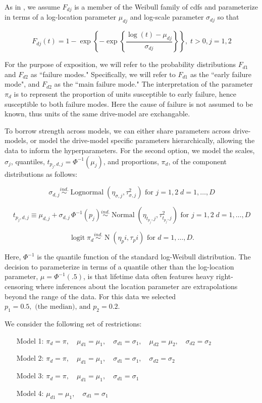 \documentclass[12pt]{article}
\newcommand{\ind}{\stackrel{ind.}{\sim}}
\newcommand{\op}{\operatorname}
\begin{document}
As in \cite{chan}, we assume $F_{dj}$ is a member of the Weibull family of cdfs and parameterize in terms of a log-location parameter $\mu_{dj}$ and log-scale parameter $\sigma_{dj}$ so that

$$F_{dj}(t) = 1 - \exp \left\{ -\exp \left\{ \frac{ \log (t) - \mu_{dj}}{\sigma_{dj}} \right\} \right\},\; t>0, j=1,2$$

For the purpose of exposition, we will refer to the probability distributions $F_{d1}$ and $F_{d2}$ as ``failure modes." Specifically, we will refer to $F_{d1}$ as the ``early failure mode", and $F_{d2}$ as the ``main failure mode." The interpretation of the parameter $\pi_d$ is to represent the proportion of units susceptible to early failure, hence susceptible to both failure modes. Here the cause of failure is not assumed to be known, thus units of the same drive-model are exchangable.

To borrow strength across models, we can either share parameters across drive-models, or model the drive-model specific parameters hierarchically, allowing the data to inform the hyperparameters. For the second option, we model the scales, $\sigma_j$, quantiles, $t_{p_j,d,j} = \Phi^{-1}(\mu_j)$, and proportions, $\pi_d$, of the component distributions as follows:

$$\sigma_{d,j} \ind \op{Lognormal} \left( \eta_{\sigma,j}, \tau^2_{\sigma,j} \right) \mbox{ for } j=1,2\; d=1,\ldots,D$$

$$t_{p_j,d,j} \equiv \mu_{d,j} + \sigma_{d,j}\,\Phi^{-1}(p_j)  \ind \op{Normal} \left(\eta_{t_{p_j},j}, \tau^2_{t_{p_j},j}\right) \mbox{ for } j=1,2\; d=1,\ldots,D$$

$$\op{logit} \pi_d \ind \op{N}(\eta_pi, \tau_pi) \mbox{ for } d=1,\ldots,D.$$

Here, $\Phi^{-1}$ is the quantile function of the standard log-Weibull distribution. The decision to parameterize in terms of a quantile other than the log-location parameter, $\mu = \Phi^{-1}(.5)$, is that lifetime data often features heavy right-censoring where inferences about the location parameter are extrapolations beyond the range of the data. For this data we selected $p_1=0.5,\mbox{ (the median), and } p_2 = 0.2$.

We consider the following set of restrictions:

\begin{enumerate}
\item[Model 1:] $\pi_{d} = \pi,\quad \mu_{d1} = \mu_1,\quad \sigma_{d1}=\sigma_1,\quad \mu_{d2} = \mu_2,\quad \sigma_{d2} = \sigma_2$
\item[Model 2:] $\pi_{d} = \pi,\quad \mu_{d1} = \mu_1,\quad \sigma_{d1}=\sigma_1,\quad \sigma_{d2} = \sigma_2$
\item[Model 3:] $\pi_{d} = \pi,\quad \mu_{d1} = \mu_1,\quad \sigma_{d1}=\sigma_1$
\item[Model 4:] $\mu_{d1} = \mu_1,\quad \sigma_{d1}=\sigma_1$
\end{enumerate}
\end{document}
